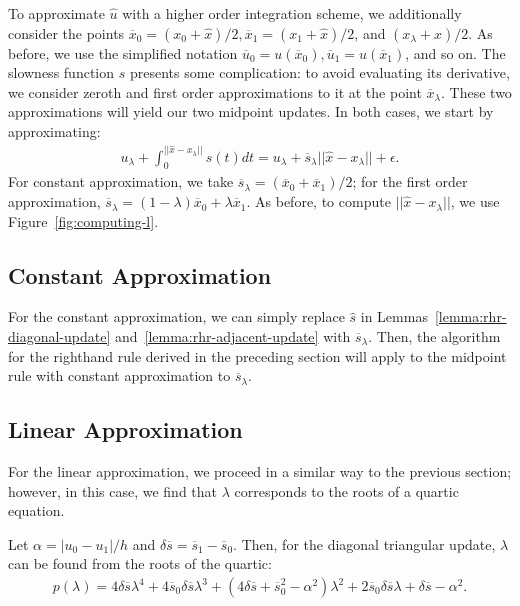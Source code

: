 \documentclass{article}
\begin{document}
To approximate $\hat{u}$ with a higher order integration scheme, we
additionally consider the points
$\overline{x}_0 = (x_0 + \hat{x})/2, \overline{x}_1 = (x_1 +
\hat{x})/2$, and $(x_\lambda + \hat{x})/2$. As before, we use the
simplified notation
$\overline{u}_0 = u(\overline{x}_0), \overline{u}_1 =
u(\overline{x}_1)$, and so on. The slowness function $s$ presents some
complication: to avoid evaluating its derivative, we consider zeroth
and first order approximations to it at the point
$\overline{x}_\lambda$. These two approximations will yield our two
midpoint updates. In both cases, we start by approximating:
\begin{align*}
  u_{\lambda} + \int_0^{||\hat{x} - x_\lambda||} s(t) dt = u_\lambda + \overline{s}_\lambda ||\hat{x} - x_\lambda|| + \epsilon.
\end{align*}
For constant approximation, we take
$\overline{s}_\lambda = (\overline{x}_0 + \overline{x}_1)/2$; for the
first order approximation,
$\overline{s}_\lambda = (1 - \lambda) \overline{x}_0 + \lambda
\overline{x}_1$. As before, to compute $||\hat{x} - x_\lambda||$, we
use Figure~\ref{fig:computing-l}.

\subsection{Constant Approximation}

For the constant approximation, we can simply replace $\hat{s}$ in
Lemmas~\ref{lemma:rhr-diagonal-update}
and~\ref{lemma:rhr-adjacent-update} with $\overline{s}_\lambda$. Then,
the algorithm for the righthand rule derived in the preceding section
will apply to the midpoint rule with constant approximation to
$\overline{s}_\lambda$.

\subsection{Linear Approximation}

For the linear approximation, we proceed in a similar way to the
previous section; however, in this case, we find that $\lambda$
corresponds to the roots of a quartic equation.

\begin{lemma}\label{lemma:midpoint-diagonal-update}
  Let $\alpha = |u_0 - u_1|/h$ and
  $\delta \overline{s} = \overline{s}_1 - \overline{s}_0$. Then, for
  the diagonal triangular update, $\lambda$ can be found from the
  roots of the quartic:
  \begin{align*}
    p(\lambda) = 4 \delta \overline{s} \lambda^4 + 4 \overline{s}_0 \delta \overline{s} \lambda^3 + {(4 \delta \overline{s} + \overline{s}_0^2 - \alpha^2)} \lambda^2 + 2 \overline{s}_0 \delta \overline{s} \lambda + \delta \overline{s} - \alpha^2.
  \end{align*}
\end{lemma}
\end{document}
